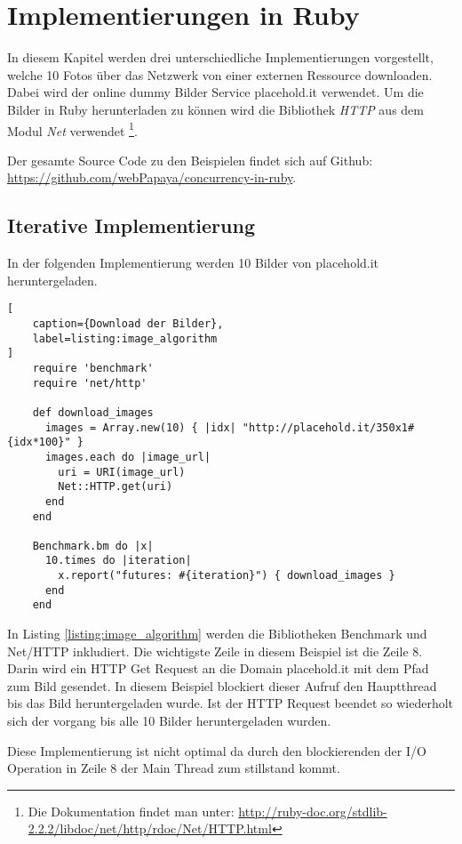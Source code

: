 \section{Implementierungen in Ruby}
\label{section:implementation}

In diesem Kapitel werden drei unterschiedliche Implementierungen vorgestellt, welche 10 Fotos über das Netzwerk von einer externen Ressource downloaden. Dabei wird der online dummy Bilder Service placehold.it verwendet. Um die Bilder in Ruby herunterladen zu können wird die Bibliothek \emph{HTTP} aus dem Modul \emph{Net} verwendet \footnote{Die Dokumentation findet man unter: \url{http://ruby-doc.org/stdlib-2.2.2/libdoc/net/http/rdoc/Net/HTTP.html}}.

Der gesamte Source Code zu den Beispielen findet sich auf Github: \url{https://github.com/webPapaya/concurrency-in-ruby}.


\subsection{Iterative Implementierung}

In der folgenden Implementierung werden 10 Bilder von placehold.it heruntergeladen.

\begin{lstlisting}[
	caption={Download der Bilder},
	label=listing:image_algorithm
]
	require 'benchmark'
	require 'net/http'

	def download_images
	  images = Array.new(10) { |idx| "http://placehold.it/350x1#{idx*100}" }
	  images.each do |image_url|
	    uri = URI(image_url)
	    Net::HTTP.get(uri)
	  end
	end

	Benchmark.bm do |x|
	  10.times do |iteration|
	    x.report("futures: #{iteration}") { download_images }
	  end
	end
\end{lstlisting}

In Listing \ref{listing:image_algorithm} werden die Bibliotheken Benchmark und Net/HTTP inkludiert. Die wichtigste Zeile in diesem Beispiel ist die Zeile 8. Darin wird ein HTTP Get Request an die Domain placehold.it mit dem Pfad zum Bild gesendet. In diesem Beispiel blockiert dieser Aufruf den Hauptthread bis das Bild heruntergeladen wurde. Ist der HTTP Request beendet so wiederholt sich der vorgang bis alle 10 Bilder heruntergeladen wurden. 

Diese Implementierung ist nicht optimal da durch den blockierenden der I/O Operation in Zeile 8 der Main Thread zum stillstand kommt. 



